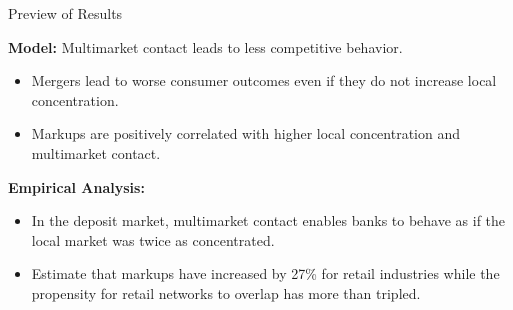 \documentclass[notes,10.2pt, aspectratio=169]{beamer}
\newenvironment{wideitemize}{\itemize\addtolength{\itemsep}{10pt}}{\enditemize}
\begin{document}
\begin{frame}{Preview of Results}

    \vspace{0.5cm}
      \begin{wideitemize}

      \item \textbf{Model:} Multimarket contact leads to less competitive behavior.
      \vspace{0.2cm}
      \begin{itemize}
        \item Mergers lead to worse consumer outcomes even if they do not increase local concentration.
        \item Markups are positively correlated with higher local concentration and multimarket contact.
      \end{itemize}
      \pause
      \item \textbf{Empirical Analysis:} 
      \vspace{0.2cm}
      \begin{itemize}
        \item In the deposit market, multimarket contact enables banks to behave as if the local market was twice as concentrated. 
        \item Estimate that markups have increased by 27\% for retail industries while the propensity for retail networks to overlap has more than tripled. 
      \end{itemize}
    \end{wideitemize}
      \end{frame}
    
\end{document}
